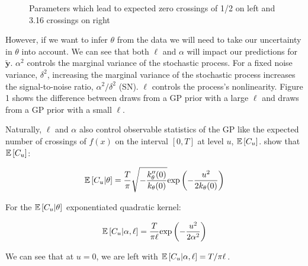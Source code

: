 \documentclass{article}
\newcommand{\Exp}[1]{\ensuremath{\mathbb{E} \lb #1 \rb}}
\newcommand{\lb}{\ensuremath{\left[}}
\newcommand{\rb}{\ensuremath{\right]}}
\begin{document}
\begin{figure} \label{prior-lat-draws}
  \caption{Parameters which lead to expected zero crossings of 1/2 on left and 3.16 crossings on right} \label{prior-lat-draws}
\end{figure}

However, if we want to infer $\theta$ from the data we will need to take our
uncertainty in $\theta$ into account. We can see that both $\ell$ and $\alpha$
will impact our predictions for $\tilde{\mathbf{y}}$. $\alpha^2$ controls the
marginal variance of the stochastic process. For a fixed noise variance,
$\delta^2$, increasing the marginal variance of the stochastic process
increases the signal-to-noise ratio, $\alpha^2 / \delta^2$ (SN). $\ell$
controls the process's nonlinearity. Figure 1 shows the
difference between draws from a GP prior with a large $\ell$ and draws from a
GP prior with a small $\ell$.


Naturally, $\ell$ and $\alpha$ also control observable statistics of the
GP like the expected number of crossings of $f(x)$ on the interval $[0,
T]$ at level $u$, $\Exp{C_u}$. \citet{cramer2004stationary} show that $\Exp{C_u}$:

\begin{align*} 
  \Exp{C_u | \theta} = \dfrac{T}{\pi} 
\sqrt{-\dfrac{k_\theta^{\prime \prime}(0)}{k_\theta(0)}}
  \text{exp}\left(-\dfrac{u^2}{2k_\theta(0)}\right)
\end{align*} 

For the $\Exp{C_u | \theta}$ exponentiated quadratic kernel:

\begin{align*} 
  \Exp{C_u | \alpha, \ell} = \dfrac{T}{\pi \ell}\text{exp}\left(-\dfrac{u^2}{2 \alpha ^ 2} \right)
\end{align*} 

We can see that at $u = 0$, we are left with $\Exp{C_u | \alpha, \ell} = T / \pi \ell$.  
\end{document}
